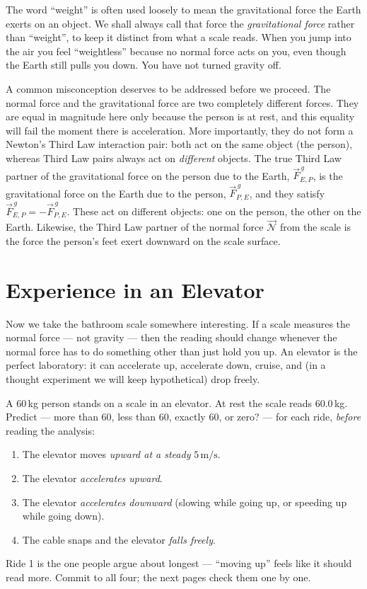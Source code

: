 The word ``weight'' is often used loosely to mean the gravitational force the Earth exerts on an object. We shall always call that force the \textit{gravitational force} rather than ``weight'', to keep it distinct from what a scale reads. When you jump into the air you feel ``weightless'' because no normal force acts on you, even though the Earth still pulls you down. You have not turned gravity off.

A common misconception deserves to be addressed before we proceed. The normal force and the gravitational force are two completely different forces. They are equal in magnitude here only because the person is at rest, and this equality will fail the moment there is acceleration. More importantly, they do not form a Newton's Third Law interaction pair: both act on the same object (the person), whereas Third Law pairs always act on \textit{different} objects. The true Third Law partner of the gravitational force on the person due to the Earth, $\vec{F}^{\,g}_{E,P}$, is the gravitational force on the Earth due to the person,  $\vec{F}^{\,g}_{P,E}$, and they satisfy \(\vec{F}^{\,g}_{E,P} = -\vec{F}^{\,g}_{P,E}\). These act on different objects: one on the person, the other on the Earth. Likewise, the Third Law partner of the normal force $\vec{\mathscr{N}}$ from the scale is the force the person's feet exert downward on the scale surface.


\section*{Experience in an Elevator}

Now we take the bathroom scale somewhere interesting. If a scale measures
the normal force --- not gravity --- then the reading should change whenever the
normal force has to do something other than just hold you up. An elevator is
the perfect laboratory: it can accelerate up, accelerate down, cruise, and
(in a thought experiment we will keep hypothetical) drop freely.

\begin{predictbox}
A 60\,kg person stands on a scale in an elevator. At rest the scale reads
60.0\,kg. Predict --- more than 60, less than 60, exactly 60, or zero? --- for
each ride, \emph{before} reading the analysis:
\begin{enumerate}[leftmargin=2em, itemsep=1pt]
  \item The elevator moves \emph{upward at a steady} $5\,\mathrm{m/s}$.
  \item The elevator \emph{accelerates upward}.
  \item The elevator \emph{accelerates downward} (slowing while going up, or
        speeding up while going down).
  \item The cable snaps and the elevator \emph{falls freely}.
\end{enumerate}
Ride 1 is the one people argue about longest --- ``moving up'' feels like it
should read more. Commit to all four; the next pages check them one by one.
\end{predictbox}

